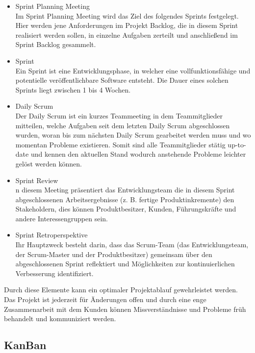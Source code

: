 \begin{itemize}
    \item Sprint Planning Meeting \\
    Im Sprint Planning Meeting wird das Ziel des folgendes Sprints festgelegt. Hier werden
    jene Anforderungen im Projekt Backlog, die in diesem Sprint realisiert werden sollen,
    in einzelne Aufgaben zerteilt und anschließend im Sprint Backlog gesammelt.
    \item Sprint \\
    Ein Sprint ist eine Entwicklungsphase, in welcher eine vollfunktionsfähige und potentielle
    veröffentlichbare Software entsteht. Die Dauer eines solchen Sprints liegt zwischen
    1 bis 4 Wochen.
    \item Daily Scrum \\
    Der Daily Scrum ist ein kurzes Teammeeting in dem Teammitglieder mitteilen, welche
    Aufgaben seit dem letzten Daily Scrum abgeschlossen wurden, woran bis zum nächsten
    Daily Scrum gearbeitet werden muss und wo momentan Probleme existieren. Somit sind alle
    Teammitglieder stätig up-to-date und kennen den aktuellen Stand wodurch anstehende Probleme
    leichter gelöst werden können.
    \item Sprint Review \\
    n diesem Meeting präsentiert das Entwicklungsteam die in diesem Sprint abgeschlossenen
    Arbeitsergebnisse (z. B. fertige Produktinkremente) den Stakeholdern, dies können
    Produktbesitzer, Kunden, Führungskräfte und andere Interessengruppen sein.
    \item Sprint Retroperspektive \\
    Ihr Hauptzweck besteht darin, dass das Scrum-Team (das Entwicklungsteam, der Scrum-Master
    und der Produktbesitzer) gemeinsam über den abgeschlossenen Sprint reflektiert und
    Möglichkeiten zur kontinuierlichen Verbesserung identifiziert.
\end{itemize}
\noindent Durch diese Elemente kann ein optimaler Projektablauf gewehrleistet werden. Das
Projekt ist jederzeit für Änderungen offen und durch eine enge Zusammenarbeit mit dem Kunden
können Missverständnisse und Probleme früh behandelt und kommuniziert werden.

\subsection{KanBan}

